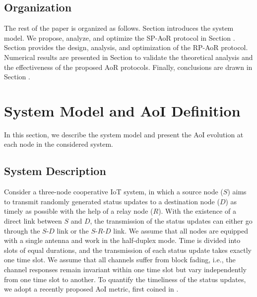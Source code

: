 \documentclass{IEEEtran}
\begin{document}
\subsection{Organization}
The rest of the paper is organized as follows. Section \uppercase\expandafter{} introduces the system model. We propose, analyze, and optimize the SP-AoR protocol in Section \uppercase\expandafter{}. Section \uppercase\expandafter{} provides the design, analysis, and optimization of the RP-AoR protocol. Numerical results are presented in Section \uppercase\expandafter{} to validate the theoretical analysis and the effectiveness of the proposed AoR protocols. Finally, conclusions are drawn in Section \uppercase\expandafter{}.

\section{System Model and AoI Definition}
In this section, we describe the system model and present the AoI evolution at each node in the considered system.

\subsection{System Description}
Consider  a three-node cooperative IoT system, in which a source node ($S$) aims to transmit randomly generated status updates to a destination node ($D$) as timely as possible with the help of a relay node ($R$). With the existence of a direct link between $S$ and $D$, the transmission of the status updates can either go through the $S$-$D$ link or the $S$-$R$-$D$ link. We assume that all nodes are equipped with a single antenna and work in the half-duplex mode. Time is divided into slots of equal durations, and the transmission of each status update takes exactly one time slot. We assume that all channels suffer from block fading, i.e., the channel responses remain invariant within one time slot but vary independently from one time slot to another. To quantify the timeliness of the status updates, we adopt a recently proposed AoI metric, first coined in \cite{b1}.
\end{document}
